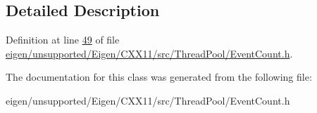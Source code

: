 \subsection{Detailed Description}


Definition at line \hyperlink{eigen_2unsupported_2_eigen_2_c_x_x11_2src_2_thread_pool_2_event_count_8h_source_l00049}{49} of file \hyperlink{eigen_2unsupported_2_eigen_2_c_x_x11_2src_2_thread_pool_2_event_count_8h_source}{eigen/unsupported/\+Eigen/\+C\+X\+X11/src/\+Thread\+Pool/\+Event\+Count.\+h}.



The documentation for this class was generated from the following file\+:\begin{DoxyCompactItemize}
\item 
eigen/unsupported/\+Eigen/\+C\+X\+X11/src/\+Thread\+Pool/\+Event\+Count.\+h\end{DoxyCompactItemize}
